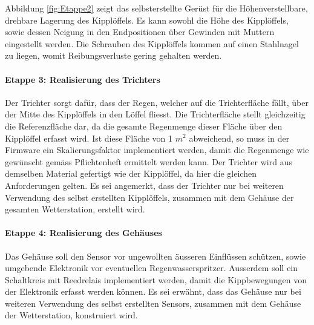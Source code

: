 Abbildung \ref{fig:Etappe2} zeigt das selbsterstellte Gerüst für die Höhenverstellbare, drehbare Lagerung des Kipplöffels. Es kann sowohl die Höhe des Kipplöffels, sowie dessen Neigung in den Endpositionen über Gewinden mit Muttern eingestellt werden. Die Schrauben des Kipplöffels kommen auf einen Stahlnagel zu liegen, womit Reibungsverluste gering gehalten werden.

\paragraph{Etappe 3: Realisierung des Trichters}
Der Trichter sorgt dafür, dass der Regen, welcher auf die Trichterfläche fällt, über der Mitte des Kipplöffels in den Löffel fliesst. Die Trichterfläche stellt gleichzeitig die Referenzfläche dar, da die gesamte Regenmenge dieser Fläche über den Kipplöffel erfasst wird. Ist diese Fläche von 1 $m^2$ abweichend, so muss in der Firmware ein Skalierungsfaktor implementiert werden, damit die Regenmenge wie gewünscht gemäss Pflichtenheft ermittelt werden kann. Der Trichter wird aus demselben Material gefertigt wie der Kipplöffel, da hier die gleichen Anforderungen gelten. Es sei angemerkt, dass der Trichter nur bei weiteren Verwendung des selbst erstellten Kipplöffels, zusammen mit dem Gehäuse der gesamten Wetterstation, erstellt wird.

\paragraph{Etappe 4: Realisierung des Gehäuses}
Das Gehäuse soll den Sensor vor ungewollten äusseren Einflüssen schützen, sowie umgebende Elektronik vor eventuellen Regenwasserspritzer. Ausserdem soll ein Schaltkreis mit Reedrelais implementiert werden, damit die Kippbewegungen von der Elektronik erfasst werden können. Es sei erwähnt, dass das Gehäuse nur bei weiteren Verwendung des selbst erstellten Sensors, zusammen mit dem Gehäuse der Wetterstation, konstruiert wird.

